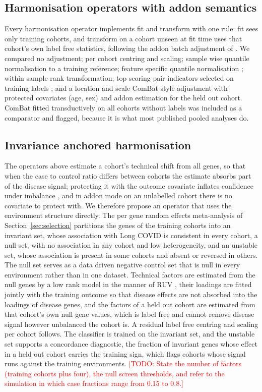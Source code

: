 \documentclass[unnumsec,webpdf,contemporary,large]{oup-authoring-template}
\newcommand{\todo}[1]{\textcolor{red}{[TODO: #1]}}
\begin{document}
\subsection{Harmonisation operators with addon semantics}\label{sec:loso}

Every harmonisation operator implements fit and transform with one rule: fit sees only training cohorts, and transform on a cohort unseen at fit time uses that cohort's own label free statistics, following the addon batch adjustment of \citet{hornung2017}. We compared no adjustment; per cohort centring and scaling; sample wise quantile normalisation to a training reference; feature specific quantile normalisation \citep{franks2018}; within sample rank transformation; top scoring pair indicators selected on training labels \citep{geman2004}; and a location and scale ComBat style adjustment with protected covariates (age, sex) and addon estimation for the held out cohort. ComBat fitted transductively on all cohorts without labels \citep{johnson2007} was included as a comparator and flagged, because it is what most published pooled analyses do.

\subsection{Invariance anchored harmonisation}

The operators above estimate a cohort's technical shift from all genes, so that when the case to control ratio differs between cohorts the estimate absorbs part of the disease signal; protecting it with the outcome covariate inflates confidence under imbalance \citep{nygaard2016}, and in addon mode on an unlabelled cohort there is no covariate to protect with. We therefore propose an operator that uses the environment structure directly. The per gene random effects meta-analysis of Section~\ref{sec:selection} partitions the genes of the training cohorts into an invariant set, whose association with Long COVID is consistent in every cohort, a null set, with no association in any cohort and low heterogeneity, and an unstable set, whose association is present in some cohorts and absent or reversed in others. The null set serves as a data driven negative control set that is null in every environment rather than in one dataset. Technical factors are estimated from the null genes by a low rank model in the manner of RUV \citep{gagnonbartsch2012}, their loadings are fitted jointly with the training outcome so that disease effects are not absorbed into the loadings of disease genes, and the factors of a held out cohort are estimated from that cohort's own null gene values, which is label free and cannot remove disease signal however unbalanced the cohort is. A residual label free centring and scaling per cohort follows. The classifier is trained on the invariant set, and the unstable set supports a concordance diagnostic, the fraction of invariant genes whose effect in a held out cohort carries the training sign, which flags cohorts whose signal runs against the training environments. \todo{State the number of factors (training cohorts plus four), the null screen thresholds, and refer to the simulation in which case fractions range from 0.15 to 0.8.}
\end{document}
